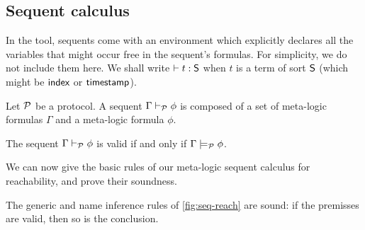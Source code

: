 \subsection{Sequent calculus}

In the tool, sequents come with an environment which explicitly
declares all the variables that might occur free in the sequent's formulas.
For simplicity, we do not include them here. We shall write $\vdash t:\textsf{S}$
when $t$ is a term of sort $\textsf{S}$ (which might be $\textsf{index}$ or $\textsf{timestamp}$).

\begin{definition}
  Let $\mathcal{P}$ be a protocol. A sequent $\Gamma \vdash_{\mathcal{P}} \phi$ is composed of a set of meta-logic formulas $\Gamma$ and a meta-logic formula $\phi$.

  The sequent $\Gamma \vdash_{\mathcal{P}} \phi$ is valid if and only if $\Gamma \models_{\mathcal{P}} \phi$.
\end{definition}

We can now give the basic rules of our meta-logic sequent calculus for reachability, and prove their soundness.
\begin{proposition}
  The generic and name inference rules of \cref{fig:seq-reach} are sound: if the premisses are valid,
  then so is the conclusion.
\end{proposition}


